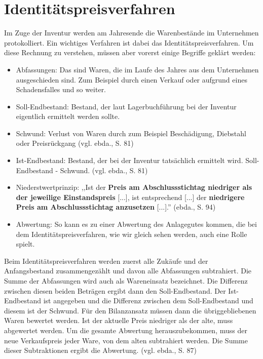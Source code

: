\documentclass[12pt]{report}
\begin{document}
\section{Identitätspreisverfahren}

Im Zuge der Inventur werden am Jahresende die Warenbestände im Unternehmen protokolliert. Ein wichtiges Verfahren ist dabei das Identitätspreisverfahren. Um diese Rechnung zu verstehen, müssen aber vorerst einige Begriffe geklärt werden:

\begin{itemize}
	\item Abfassungen: Das sind Waren, die im Laufe des Jahres aus dem Unternehmen ausgeschieden sind. Zum Beispiel durch einen Verkauf oder aufgrund eines Schadensfalles und so weiter.
	\item Soll-Endbestand: Bestand, der laut Lagerbuchführung bei der Inventur eigentlich ermittelt werden sollte.
	\item Schwund: Verlust von Waren durch zum Beispiel Beschädigung, Diebstahl oder Preisrückgang (vgl. ebda., S. 81\nocite{RW4})
	\item Ist-Endbestand: Bestand, der bei der Inventur tatsächlich ermittelt wird. Soll-Endbestand - Schwund. (vgl. ebda., S. 81\nocite{RW4})
	\item Niederstwertprinzip: ,,Ist der \textbf{Preis am Abschlussstichtag niedriger als der jeweilige Einstandspreis} [...], ist entsprechend [...] der \textbf{niedrigere Preis am Abschlussstichtag anzusetzen} [...].'' (ebda., S. 94\nocite{RW4})
	\item Abwertung: So kann es zu einer Abwertung des Anlagegutes kommen, die bei dem Identitätspreisverfahren, wie wir gleich sehen werden, auch eine Rolle spielt.
\end{itemize}

\noindent Beim Identitätspreisverfahren werden zuerst alle Zukäufe und der Anfangsbestand zusammengezählt und davon alle Abfassungen subtrahiert. Die Summe der Abfassungen wird auch als Wareneinsatz bezeichnet. Die Differenz zwischen diesen beiden Beträgen ergibt dann den Soll-Endbestand. Der Ist-Endbestand ist angegeben und die Differenz zwischen dem Soll-Endbestand und diesem ist der Schwund. Für den Bilanzansatz müssen dann die übriggebliebenen Waren bewertet werden. Ist der aktuelle Preis niedriger als der alte, muss abgewertet werden. Um die gesamte Abwertung herauszubekommen, muss der neue Verkaufspreis jeder Ware, von dem alten subtrahiert werden. Die Summe dieser Subtraktionen ergibt die Abwertung. (vgl. ebda., S. 87\nocite{RW4})
\end{document}
